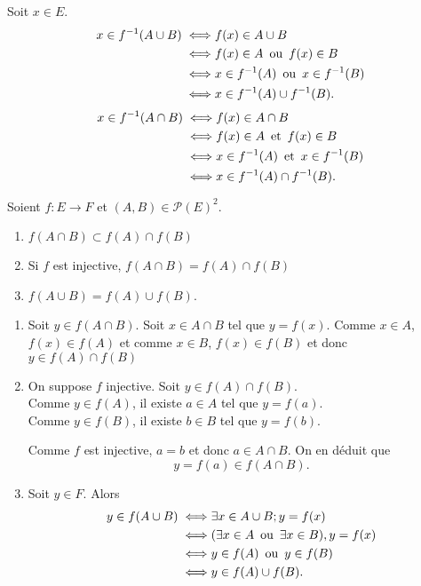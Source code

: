 \begin{prv}
	Soit $x \in E$.
	\begin{align*}
		x \in f^{-1}(A \cup B) \iff& f(x) \in A\cup B\\
		\iff& f(x) \in A \operatorname{\text{ ou }} f(x) \in B\\
		\iff& x \in f^{-1}(A) \operatorname{\text{ ou }} x \in f^{-1}(B)\\
		\iff& x \in f^{-1}(A) \cup f^{-1}(B).
	\end{align*}
	\begin{align*}
		x \in f^{-1}(A \cap B) \iff& f(x) \in A\cap B\\
		\iff& f(x) \in A \operatorname{\text{ et }} f(x) \in B\\
		\iff& x \in f^{-1}(A) \operatorname{\text{ et }} x \in f^{-1}(B)\\
		\iff& x \in f^{-1}(A) \cap f^{-1}(B).
	\end{align*}
\end{prv}

\begin{prop}
	Soient $f: E \to F$ et $(A,B) \in \mathcal{P}(E)^2$.

	\begin{enumerate}
		\item $f(A \cap B) \subset f(A)\cap f(B)$
		\item Si $f$ est injective, $f(A\cap B) = f(A) \cap f(B)$
		\item $f(A\cup B) = f(A) \cup f(B)$.
	\end{enumerate}
\end{prop}

\begin{prv}
	\begin{enumerate}
		\item Soit $y \in f(A \cap B)$. Soit $x \in A \cap B$ tel que $y = f(x)$.
			Comme $x \in A$, $f(x) \in f(A)$ et comme $x \in B$, $f(x) \in f(B)$ 
			et donc $y \in f(A)\cap f(B)$
		\item On suppose $f$ injective. Soit $y \in f(A) \cap f(B)$.\\
			Comme $y \in f(A)$, il existe $a \in A$ tel que $y = f(a)$.\\
			Comme $y \in f(B)$, il existe $b \in B$ tel que $y = f(b)$.

			Comme $f$ est injective, $a = b$ et donc $a \in A \cap B$. On en déduit que \[
				y = f(a) \in f(A\cap B).
			\]
		\item Soit $y \in F$. Alors
			\begin{align*}
				y \in f(A\cup B) \iff& \exists x \in A\cup B; y = f(x)\\
				\iff& (\exists x \in A \operatorname{\text{ ou }} \exists x \in B), y = f(x)\\
				\iff& y \in f(A) \operatorname{\text{ ou }} y \in f(B)\\
				\iff& y \in f(A) \cup f(B).
			\end{align*}
	\end{enumerate}
\end{prv}

